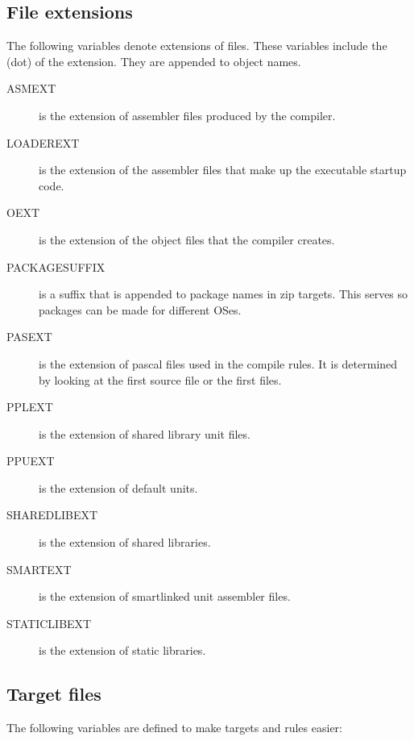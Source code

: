 \documentclass{report}
\begin{document}
\subsection{File extensions}

The following variables denote extensions of files. These variables include
the  (dot) of the extension. They are appended to object names.

\begin{description}
\item[ASMEXT] is the extension of assembler files produced by the compiler.
\item[LOADEREXT] is the extension of the assembler files that make up the
executable startup code.
\item[OEXT] is the extension of the  object files that the compiler creates.
\item[PACKAGESUFFIX] is a suffix that is appended to package names in zip
targets. This serves so packages can be made for different OSes.
\item[PASEXT] is the extension of pascal files used in the compile rules.
It is determined by looking at the first  source file or
the first  files.
\item[PPLEXT] is the extension of shared library unit files.
\item[PPUEXT] is the extension of default units.
\item[SHAREDLIBEXT] is the extension of shared libraries.
\item[SMARTEXT] is the extension of smartlinked unit assembler files.
\item[STATICLIBEXT] is the extension of static libraries.
\end{description}

\subsection{Target files}

The following variables are defined to make targets and rules easier:
\end{document}
